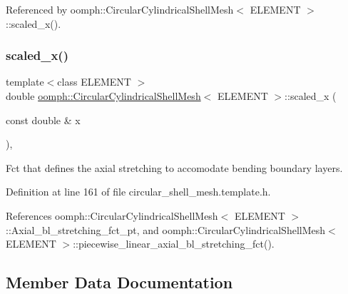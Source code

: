 Referenced by oomph\+::\+Circular\+Cylindrical\+Shell\+Mesh$<$ E\+L\+E\+M\+E\+N\+T $>$\+::scaled\+\_\+x().

\mbox{\label{classoomph_1_1CircularCylindricalShellMesh_a4fb67c76ca3ad60efadfe2d3aabcfa0b}} 
\subsubsection{\texorpdfstring{scaled\+\_\+x()}{scaled\_x()}}
{\footnotesize\ttfamily template$<$class E\+L\+E\+M\+E\+NT $>$ \\
double \hyperlink{classoomph_1_1CircularCylindricalShellMesh}{oomph\+::\+Circular\+Cylindrical\+Shell\+Mesh}$<$ E\+L\+E\+M\+E\+NT $>$\+::scaled\+\_\+x (\begin{DoxyParamCaption}\item[{const double \&}]{x }\end{DoxyParamCaption})\hspace{0.3cm}{\ttfamily [inline]}, {\ttfamily [private]}}



Fct that defines the axial stretching to accomodate bending boundary layers. 



Definition at line 161 of file circular\+\_\+shell\+\_\+mesh.\+template.\+h.



References oomph\+::\+Circular\+Cylindrical\+Shell\+Mesh$<$ E\+L\+E\+M\+E\+N\+T $>$\+::\+Axial\+\_\+bl\+\_\+stretching\+\_\+fct\+\_\+pt, and oomph\+::\+Circular\+Cylindrical\+Shell\+Mesh$<$ E\+L\+E\+M\+E\+N\+T $>$\+::piecewise\+\_\+linear\+\_\+axial\+\_\+bl\+\_\+stretching\+\_\+fct().



\subsection{Member Data Documentation}
\mbox{\label{classoomph_1_1CircularCylindricalShellMesh_a5669a7c088fe0d30f7d011275861f6b9}} 
